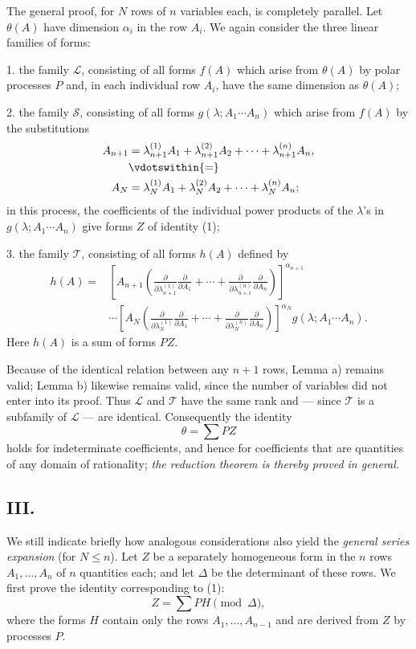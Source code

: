 \documentclass[11pt]{article}
\begin{document}
The general proof, for $N$ rows of $n$ variables each, is completely parallel. Let $\theta(A)$ have dimension $\alpha_i$ in the row $A_i$. We again consider the three linear families of forms:

1. the family $\mathcal L$, consisting of all forms $f(A)$ which arise from $\theta(A)$ by polar processes $P$ and, in each individual row $A_i$, have the same dimension as $\theta(A)$;

2. the family $\mathcal S$, consisting of all forms $g(\lambda;A_1\cdots A_n)$ which arise from $f(A)$ by the substitutions
\[
\begin{aligned}
 A_{n+1}&=\lambda_{n+1}^{(1)}A_1+\lambda_{n+1}^{(2)}A_2+
        \cdots+\lambda_{n+1}^{(n)}A_n,\\
 &\vdotswithin{=}\\
 A_N&=\lambda_N^{(1)}A_1+\lambda_N^{(2)}A_2+
        \cdots+\lambda_N^{(n)}A_n;
\end{aligned}
\]
in this process, the coefficients of the individual power products of the $\lambda$'s in $g(\lambda;A_1\cdots A_n)$ give forms $Z$ of identity (1);

3. the family $\mathcal T$, consisting of all forms $h(A)$ defined by
\[
\begin{aligned}
 h(A)=&\left[A_{n+1}\left(
 \frac{\partial}{\partial\lambda_{n+1}^{(1)}}\frac{\partial}{\partial A_1}
 +\cdots+
 \frac{\partial}{\partial\lambda_{n+1}^{(n)}}\frac{\partial}{\partial A_n}\right)\right]^{\alpha_{n+1}} \\
&\cdots
\left[A_N\left(
 \frac{\partial}{\partial\lambda_N^{(1)}}\frac{\partial}{\partial A_1}
 +\cdots+
 \frac{\partial}{\partial\lambda_N^{(n)}}\frac{\partial}{\partial A_n}\right)\right]^{\alpha_N}
 g(\lambda;A_1\cdots A_n).
\end{aligned}
\]
Here $h(A)$ is a sum of forms $PZ$.

Because of the identical relation between any $n+1$ rows, Lemma a) remains valid; Lemma b) likewise remains valid, since the number of variables did not enter into its proof. Thus $\mathcal L$ and $\mathcal T$ have the same rank and --- since $\mathcal T$ is a subfamily of $\mathcal L$ --- are identical. Consequently the identity
\[
  \theta=\sum PZ
\]
holds for indeterminate coefficients, and hence for coefficients that are quantities of any domain of rationality; \emph{the reduction theorem is thereby proved in general.}

\subsection*{III.}
We still indicate briefly how analogous considerations also yield the \emph{general series expansion} (for $N\le n$). Let $Z$ be a separately homogeneous form in the $n$ rows $A_1,
\ldots,A_n$ of $n$ quantities each; and let $\Delta$ be the determinant of these rows. We first prove the identity corresponding to (1):
\begin{equation}
  Z=\sum PH \pmod{\Delta},
\tag{2}
\end{equation}
where the forms $H$ contain only the rows $A_1,
\ldots,A_{n-1}$ and are derived from $Z$ by processes $P$.
\end{document}
